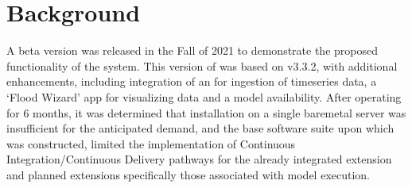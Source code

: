 \documentclass[letterpaper,12pt,english,openany,oneside]{sphinxmanual}
\begin{document}
\chapter{Background}
\label{\detokenize{euidev/background/index:background}}\label{\detokenize{euidev/background/index::doc}}
\sphinxAtStartPar
A beta version  was released in the Fall of 2021 to demonstrate the proposed functionality of the system. This version of  was based on  v3.3.2, with additional enhancements, including integration of an  for ingestion of timeseries  data, a ‘Flood Wizard’ app for visualizing data and a  model availability. After operating for 6 months, it was determined that installation on a single bare\sphinxhyphen{}metal server was insufficient for the anticipated  demand, and the base software suite upon which  was constructed, limited the implementation of Continuous Integration/Continuous Delivery pathways for the already integrated extension and planned extensions \sphinxhyphen{} specifically those associated with  model execution.
\end{document}
